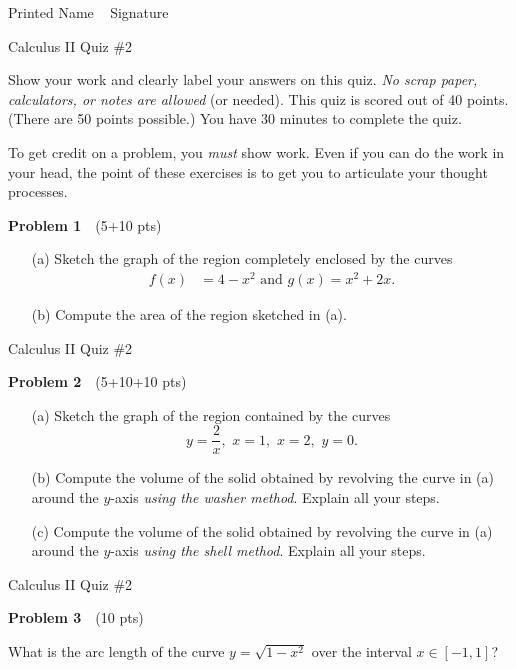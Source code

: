 \documentclass[10pt]{article}
\newcommand{\prob}[1]{\vspace{10mm} \noindent \textbf{Problem #1} \,\,}
\newcommand{\header}{
\begin{center}
Calculus II Quiz \#2
\end{center}

\vspace{2mm}

}
\newcommand{\namefield}{
\noindent Printed Name \underline{\hspace{50mm}} \,\,\, Signature \underline{\hspace{50mm}}
}
\newcommand{\inst}[2]{
Show your work and clearly label your answers on this quiz. \emph{No scrap paper, calculators, or notes are allowed} (or needed). This quiz is scored out of #1 points. (There are #2 points possible.) You have 30 minutes to complete the quiz.

To get credit on a problem, you \emph{must} show work. Even if you can do the work in your head, the point of these exercises is to get you to articulate your thought processes.
}
\begin{document}


\namefield

\header

\inst{40}{50}


\prob{1} (5+10 pts) %

\begin{itemize}
\item[(a) ] Sketch the graph of the region completely enclosed by the curves 
\begin{align*}
f(x) & = 4 - x^2 \text{ and } g(x) = x^2 + 2x.
\end{align*}
\item[(b) ] Compute the area of the region sketched in (a).
\end{itemize}

\pagebreak

\header

\prob{2} (5+10+10 pts) %

\begin{itemize}
\item[(a) ] Sketch the graph of the region contained by the curves 
\[ y = \frac{2}{x}, \,\, x = 1, \,\, x=2, \,\, y = 0. \] 
\item[(b) ] Compute the volume of the solid obtained by revolving the curve in (a) around the $y$-axis \emph{using the washer method}. Explain all your steps.
\item[(c) ] Compute the volume of the solid obtained by revolving the curve in (a) around the $y$-axis \emph{using the shell method}. Explain all your steps.
\end{itemize}

\pagebreak

\header

\prob{3} (10 pts) %

What is the arc length of the curve $y = \sqrt{1 - x^2}$ over the interval $x \in [-1,1]$?
\end{document}
